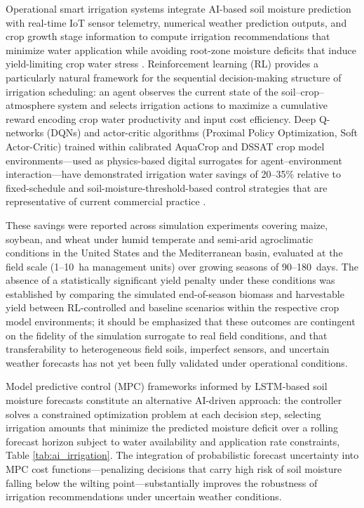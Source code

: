 \documentclass[land,review,accept,pdftex,oneauthor]{Definitions/mdpi}
\begin{document}
Operational smart irrigation systems integrate AI-based soil moisture prediction with real-time IoT sensor telemetry, numerical weather prediction outputs, and crop growth stage information to compute irrigation recommendations that minimize water application while avoiding root-zone moisture deficits that induce yield-limiting crop water stress \citep{vij2020iot}. Reinforcement learning (RL) provides a particularly natural framework for the sequential decision-making structure of irrigation scheduling: an agent observes the current state of the soil--crop--atmosphere system and selects irrigation actions to maximize a cumulative reward encoding crop water productivity and input cost efficiency. {Deep Q-networks (DQNs) and actor-critic algorithms (Proximal Policy Optimization, Soft Actor-Critic) trained within calibrated AquaCrop and DSSAT crop model  environments---used as physics-based digital surrogates for agent--environment  interaction---have demonstrated irrigation water savings of 20--35\% relative to  fixed-schedule and soil-moisture-threshold-based control strategies that are  representative of current commercial practice} \citep{saikai2023deep}.

{These savings were reported across simulation experiments covering maize, soybean, and wheat under humid temperate and semi-arid agroclimatic conditions in the United States and the Mediterranean basin, evaluated at the field scale (1--10~ha management units) over growing seasons of 90--180~days. The absence of a statistically significant yield penalty under these conditions was established by comparing the simulated end-of-season biomass and harvestable yield between RL-controlled and baseline scenarios within the respective crop model environments; it should be emphasized that these outcomes are contingent on the fidelity of the simulation surrogate to real field conditions, and that transferability to heterogeneous field soils, imperfect sensors, and uncertain weather forecasts has not yet been fully validated under operational conditions.}

Model predictive control (MPC) frameworks informed by LSTM-based soil moisture forecasts constitute an alternative AI-driven approach: the controller solves a constrained optimization problem at each decision step, selecting irrigation amounts that minimize the predicted moisture deficit over a rolling forecast horizon subject to water availability and application rate constraints, Table \ref{tab:ai_irrigation}. The integration of probabilistic forecast uncertainty into MPC cost functions---penalizing decisions that carry high risk of soil moisture falling below the wilting point---substantially improves the robustness of irrigation recommendations under uncertain weather conditions.
\end{document}
